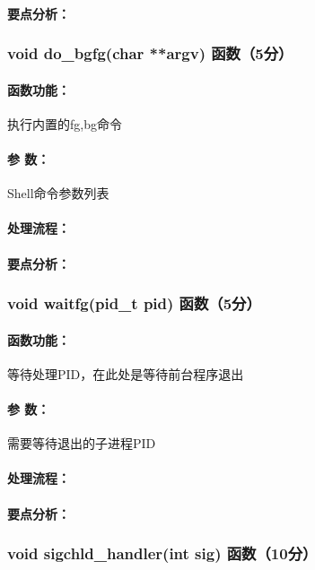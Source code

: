 \paragraph{要点分析：}

\subsubsection{void do\_bgfg(char **argv) 函数（5分）}

\paragraph{函数功能：}执行内置的fg,bg命令
\paragraph{参   数：}Shell命令参数列表
\paragraph{处理流程：}
\paragraph{要点分析：}

\subsubsection{void waitfg(pid\_t pid) 函数（5分）}

\paragraph{函数功能：}等待处理PID，在此处是等待前台程序退出
\paragraph{参   数：}需要等待退出的子进程PID
\paragraph{处理流程：}
\paragraph{要点分析：}

\subsubsection{void sigchld\_handler(int sig) 函数（10分）}

